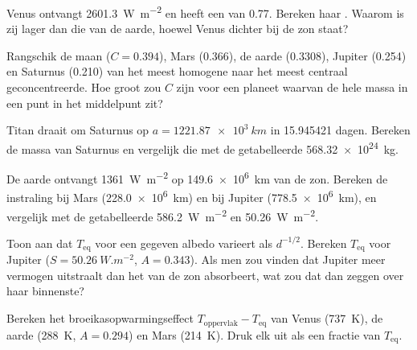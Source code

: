 \begin{exercise}[$\star$]\label{exo:b1:comparative-planetology:3}
Venus ontvangt \qty{2601.3}{W.m^{-2}} en heeft een  van 0.77. Bereken haar .
Waarom is zij lager dan die van de aarde, hoewel Venus dichter bij de zon staat?
\end{exercise}

\begin{exercise}[$\star$]\label{exo:b1:comparative-planetology:4}
Rangschik de maan ($C = 0.394$), Mars (0.366), de aarde (0.3308), Jupiter (0.254) en Saturnus (0.210) van het
meest homogene naar het meest centraal geconcentreerde. Hoe groot zou $C$ zijn voor een planeet waarvan de
hele massa in een punt in het middelpunt zit?
\end{exercise}

\begin{exercise}[$\star\star$]\label{exo:b1:comparative-planetology:5}
Titan draait om Saturnus op $a = \qty{1221.87e3}{km}$ in \num{15.945421} dagen. Bereken de massa van Saturnus en
vergelijk die met de getabelleerde \qty{568.32e24}{kg}.
\end{exercise}

\begin{exercise}[$\star\star$]\label{exo:b1:comparative-planetology:6}
De aarde ontvangt \qty{1361}{W.m^{-2}} op \qty{149.6e6}{km} van de zon. Bereken de instraling bij Mars
(\qty{228.0e6}{km}) en bij Jupiter (\qty{778.5e6}{km}), en vergelijk met de getabelleerde \qty{586.2}{W.m^{-2}}
en \qty{50.26}{W.m^{-2}}.
\end{exercise}

\begin{exercise}[$\star\star$]\label{exo:b1:comparative-planetology:7}
Toon aan dat $T_\mathrm{eq}$ voor een gegeven albedo varieert als $d^{-1/2}$. Bereken $T_\mathrm{eq}$ voor Jupiter
($S = \qty{50.26}{W.m^{-2}}$, $A = 0.343$). Als men zou vinden dat Jupiter meer vermogen uitstraalt dan het
van de zon absorbeert, wat zou dat dan zeggen over haar binnenste?
\end{exercise}

\begin{exercise}[$\star\star$]\label{exo:b1:comparative-planetology:8}
Bereken het broeikasopwarmingseffect $T_\mathrm{oppervlak} - T_\mathrm{eq}$ van Venus (\qty{737}{K}), de aarde
(\qty{288}{K}, $A = 0.294$) en Mars (\qty{214}{K}). Druk elk uit als een fractie van $T_\mathrm{eq}$.
\end{exercise}

